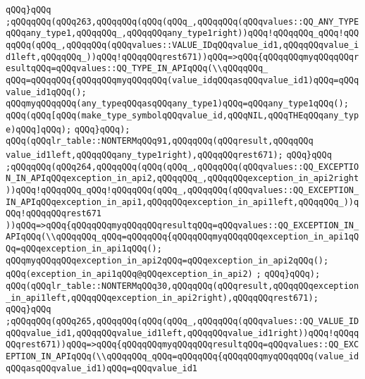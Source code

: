 \verb|qQQq}qQQq|\newline
\verb|;qQQqqQQq(qQQq263,qQQqqQQq(qQQq(qQQq_,qQQqqQQq(qQQqvalues::QQ_ANY_TYPEqQQqany_type1,qQQqqQQq_,qQQqqQQqany_type1right))qQQq!qQQqqQQq_qQQq!qQQqqQQq(qQQq_,qQQqqQQq(qQQqvalues::VALUE_IDqQQqvalue_id1,qQQqqQQqvalue_id1left,qQQqqQQq_))qQQq!qQQqqQQqrest671))qQQq=>qQQq{qQQqqQQqmyqQQqqQQqresultqQQq=qQQqvalues::QQ_TYPE_IN_APIqQQq(\\qQQqqQQq_|\newline
\verb|qQQq=qQQqqQQq{qQQqqQQqmyqQQqqQQq(value_idqQQqasqQQqvalue_id1)qQQq=qQQqvalue_id1qQQq();|\newline
\verb|qQQqmyqQQqqQQq(any_typeqQQqasqQQqany_type1)qQQq=qQQqany_type1qQQq();|\newline
\verb|qQQq(qQQq[qQQq(make_type_symbolqQQqvalue_id,qQQqNIL,qQQqTHEqQQqany_type)qQQq]qQQq);|\newline
\verb|qQQq}qQQq);|\newline
\verb|qQQq(qQQqlr_table::NONTERMqQQq91,qQQqqQQq(qQQqresult,qQQqqQQq|\newline
\verb|value_id1left,qQQqqQQqany_type1right),qQQqqQQqrest671);|\newline
\verb|qQQq}qQQq|\newline
\verb|;qQQqqQQq(qQQq264,qQQqqQQq(qQQq(qQQq_,qQQqqQQq(qQQqvalues::QQ_EXCEPTION_IN_APIqQQqexception_in_api2,qQQqqQQq_,qQQqqQQqexception_in_api2right))qQQq!qQQqqQQq_qQQq!qQQqqQQq(qQQq_,qQQqqQQq(qQQqvalues::QQ_EXCEPTION_IN_APIqQQqexception_in_api1,qQQqqQQqexception_in_api1left,qQQqqQQq_))qQQq!qQQqqQQqrest671|\newline
\verb|))qQQq=>qQQq{qQQqqQQqmyqQQqqQQqresultqQQq=qQQqvalues::QQ_EXCEPTION_IN_APIqQQq(\\qQQqqQQq_qQQq=qQQqqQQq{qQQqqQQqmyqQQqqQQqexception_in_api1qQQq=qQQqexception_in_api1qQQq();|\newline
\verb|qQQqmyqQQqqQQqexception_in_api2qQQq=qQQqexception_in_api2qQQq();|\newline
\verb|qQQq(exception_in_api1qQQq@qQQqexception_in_api2)|\newline
\verb|;|\newline
\verb|qQQq}qQQq);|\newline
\verb|qQQq(qQQqlr_table::NONTERMqQQq30,qQQqqQQq(qQQqresult,qQQqqQQqexception_in_api1left,qQQqqQQqexception_in_api2right),qQQqqQQqrest671);|\newline
\verb|qQQq}qQQq|\newline
\verb|;qQQqqQQq(qQQq265,qQQqqQQq(qQQq(qQQq_,qQQqqQQq(qQQqvalues::QQ_VALUE_IDqQQqvalue_id1,qQQqqQQqvalue_id1left,qQQqqQQqvalue_id1right))qQQq!qQQqqQQqrest671))qQQq=>qQQq{qQQqqQQqmyqQQqqQQqresultqQQq=qQQqvalues::QQ_EXCEPTION_IN_APIqQQq(\\qQQqqQQq_qQQq=qQQqqQQq{qQQqqQQqmyqQQqqQQq(value_idqQQqasqQQqvalue_id1)qQQq=qQQqvalue_id1|\newline
